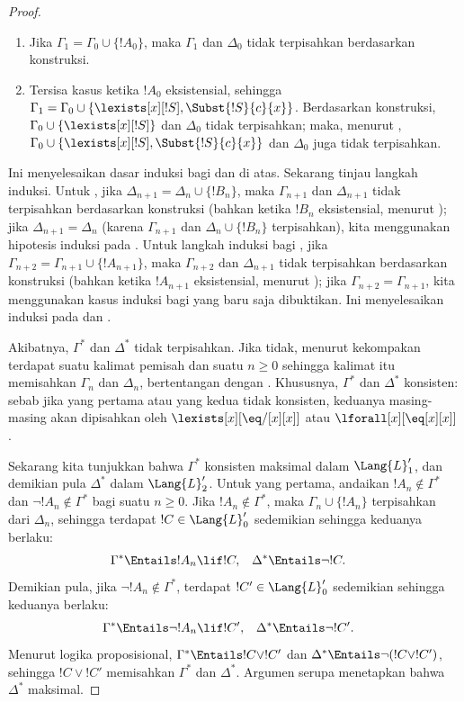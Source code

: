\documentclass[../../../include/open-logic-section]{subfiles}
\begin{document}
\begin{proof}
\begin{enumerate}
  $\Gamma_1 = \Gamma_0$ dan  hanyalah ;
\item Jika $\Gamma_1 = \Gamma_0 \cup\{ !A_0\}$, maka $\Gamma_1$ dan
  $\Delta_0$ tidak terpisahkan berdasarkan konstruksi.
\item Tersisa kasus ketika $!A_0$ eksistensial, sehingga $\Gamma_1 =
  \Gamma_0 \cup \{ \lexists[x][!S], \Subst{!S}{c}{x} \}$. Berdasarkan
  konstruksi, $\Gamma_0 \cup \{ \lexists[x][!S]\}$ dan $\Delta_0$ tidak
  terpisahkan; maka, menurut , $\Gamma_0 \cup \{
  \lexists[x][!S], \Subst{!S}{c}{x} \}$ dan $\Delta_0$ juga tidak
  terpisahkan.
\end{enumerate}
Ini menyelesaikan dasar induksi bagi  dan  di
atas. Sekarang tinjau langkah induksi. Untuk , jika
$\Delta_{n+1} = \Delta_n \cup \{ !B_n \}$, maka $\Gamma_{n+1}$ dan
$\Delta_{n+1}$ tidak terpisahkan berdasarkan konstruksi (bahkan ketika
$!B_n$ eksistensial, menurut ); jika $\Delta_{n+1} =
\Delta_n$ (karena $\Gamma_{n+1}$ dan $\Delta_n \cup \{!B_n\}$
terpisahkan), kita menggunakan hipotesis induksi pada . Untuk
langkah induksi bagi , jika $\Gamma_{n+2} = \Gamma_{n+1}
\cup \{!A_{n+1} \}$, maka $\Gamma_{n+2}$ dan $\Delta_{n+1}$ tidak
terpisahkan berdasarkan konstruksi (bahkan ketika $!A_{n+1}$ eksistensial,
menurut ); jika $\Gamma_{n+2} = \Gamma_{n+1}$, kita
menggunakan kasus induksi bagi  yang baru saja dibuktikan. Ini
menyelesaikan induksi pada  dan .

Akibatnya, $\Gamma^*$ dan $\Delta^*$ tidak terpisahkan. Jika tidak, menurut
kekompakan terdapat suatu kalimat pemisah dan suatu $n \ge 0$ sehingga
kalimat itu memisahkan $\Gamma_n$ dan $\Delta_n$, bertentangan dengan
. Khususnya, $\Gamma^*$ dan $\Delta^*$ konsisten: sebab jika
yang pertama atau yang kedua tidak konsisten, keduanya masing-masing akan
dipisahkan oleh $\lexists[x][\eq/[x][x]]$ atau
$\lforall[x][\eq[x][x]]$.

Sekarang kita tunjukkan bahwa $\Gamma^*$ konsisten maksimal dalam
$\Lang{L}'_1$, dan demikian pula $\Delta^*$ dalam $\Lang{L}'_2$. Untuk
yang pertama, andaikan $!A_n \notin \Gamma^*$ dan $\lnot !A_n \notin
\Gamma^*$ bagi suatu $n \ge 0$. Jika $!A_n \notin \Gamma^*$, maka
$\Gamma_n \cup \{!A_n \}$ terpisahkan dari $\Delta_n$, sehingga terdapat
$!C \in \Lang{L}'_0$ sedemikian sehingga keduanya berlaku:
\begin{align*}
  \Gamma^* & \Entails !A_n \lif !C, &
  \Delta^* & \Entails \lnot !C.
\end{align*}
Demikian pula, jika $\lnot !A_n \notin \Gamma^*$, terdapat $!C' \in
\Lang{L}'_0$ sedemikian sehingga keduanya berlaku:
\begin{align*}
  \Gamma^* & \Entails \lnot !A_n \lif !C', &
  \Delta^* & \Entails \lnot !C'.
\end{align*}
Menurut logika proposisional, $\Gamma^* \Entails !C \lor !C'$ dan
$\Delta^* \Entails \lnot (!C \lor !C')$, sehingga $!C \lor !C'$
memisahkan $\Gamma^*$ dan $\Delta^*$. Argumen serupa menetapkan bahwa
$\Delta^*$ maksimal.


\end{proof}
\end{document}
